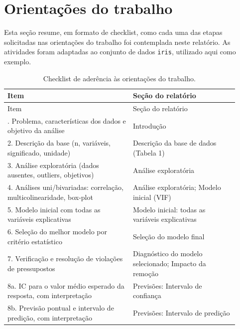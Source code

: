 \section{Orientações do trabalho}

Esta seção resume, em formato de checklist, como cada uma das etapas solicitadas nas orientações do trabalho foi contemplada neste relatório. As atividades foram adaptadas ao conjunto de dados \texttt{iris}, utilizado aqui como exemplo.

\begin{longtable}[]{@{}p{0.5\linewidth}p{0.42\linewidth}@{}}
\caption{Checklist de aderência às orientações do trabalho.}\tabularnewline
\toprule\noalign{}
Item & Seção do relatório \\
\midrule\noalign{}
\endfirsthead
\toprule\noalign{}
Item & Seção do relatório \\
\midrule\noalign{}
\endhead
\bottomrule\noalign{}
\endlastfoot
1. Problema, características dos dados e objetivo da análise & Introdução \\
2. Descrição da base (n, variáveis, significado, unidade) & Descrição da base de dados (Tabela 1) \\
3. Análise exploratória (dados ausentes, outliers, objetivos) & Análise exploratória \\
4. Análises uni/bivariadas: correlação, multicolinearidade, box-plot & Análise exploratória; Modelo inicial (VIF) \\
5. Modelo inicial com todas as variáveis explicativas & Modelo inicial: todas as variáveis explicativas \\
6. Seleção do melhor modelo por critério estatístico & Seleção do modelo final \\
7. Verificação e resolução de violações de pressupostos & Diagnóstico do modelo selecionado; Impacto da remoção \\
8a. IC para o valor médio esperado da resposta, com interpretação & Previsões: Intervalo de confiança \\
8b. Previsão pontual e intervalo de predição, com interpretação & Previsões: Intervalo de predição \\
\end{longtable}
